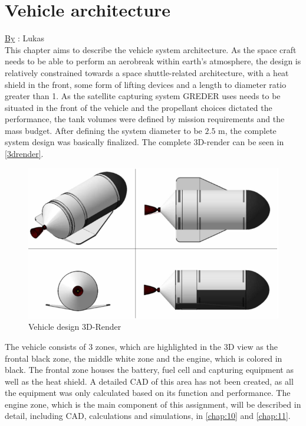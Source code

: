 \chapter{Vehicle architecture}
\qquad \underline{By} : Lukas\\

This chapter aims to describe the vehicle system architecture. As the space craft needs to be able to perform an aerobreak within earth’s atmosphere, the design is relatively constrained towards a space shuttle-related architecture, with a heat shield in the front, some form of lifting devices and a length to diameter ratio greater than 1. As the satellite capturing system GREDER uses needs to be situated in the front of the vehicle and the propellant choices dictated the performance, the tank volumes were defined by mission requirements and the mass budget. After defining the system diameter to be $2.5$ m, the complete system design was basically finalized. The complete 3D-render can be seen in \autoref{3drender}.

\begin{figure}[H]
	\centering\includegraphics[width=\linewidth]{3drender}
	\caption{Vehicle design 3D-Render}\label{3drender}
\end{figure}

The vehicle consists of 3 zones, which are highlighted in the 3D view as the frontal black zone, the middle white zone and the engine, which is colored in black. The frontal zone houses the battery, fuel cell and capturing equipment as well as the heat shield. A detailed CAD of this area has not been created, as all the equipment was only calculated based on its function and performance. The engine zone, which is the main component of this assignment, will be described in detail, including CAD, calculations and simulations, in \autoref{chap:10} and \autoref{chap:11}. \\

